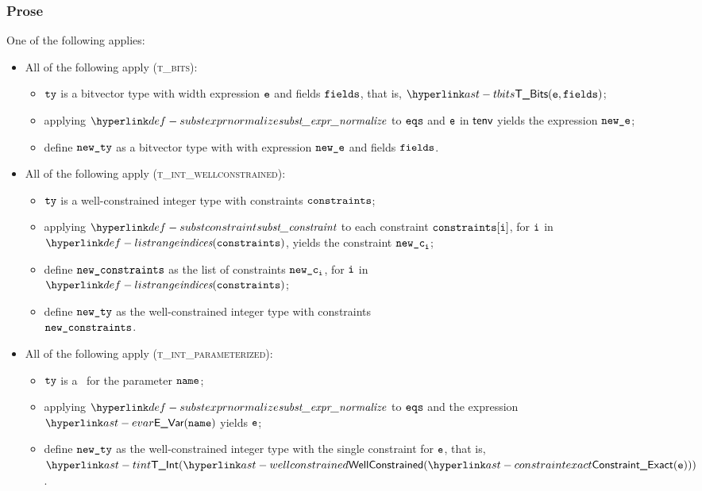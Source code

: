 \subsubsection{Prose}
One of the following applies:
\begin{itemize}
  \item All of the following apply (\textsc{t\_bits}):
  \begin{itemize}
    \item $\texttt{ty}$ is a bitvector type with width expression $\texttt{e}$ and fields $\texttt{fields}$, that is, $\TBits(\ve, \fields)$;
    \item applying $\substexprnormalize$ to $\texttt{eqs}$ and $\texttt{e}$ in $\textsf{tenv}$ yields the expression $\texttt{new\_e}$;
    \item define $\texttt{new\_ty}$ as a bitvector type with with expression $\texttt{new\_e}$ and fields $\texttt{fields}$.
  \end{itemize}

  \item All of the following apply (\textsc{t\_int\_wellconstrained}):
  \begin{itemize}
    \item $\texttt{ty}$ is a well-constrained integer type with constraints $\texttt{constraints}$;
    \item applying $\substconstraint$ to each constraint $\texttt{constraints}[\texttt{i}]$, for $\texttt{i}$ in \\
          $\listrange(\constraints)$, yields the constraint $\texttt{new\_c}_{\texttt{i}}$;
    \item define $\texttt{new\_constraints}$ as the list of constraints $\texttt{new\_c}_{\texttt{i}}$, for $\texttt{i}$ in \\
          $\listrange(\constraints)$;
    \item define $\texttt{new\_ty}$ as the well-constrained integer type with constraints \\
          $\texttt{new\_constraints}$.
  \end{itemize}

  \item All of the following apply (\textsc{t\_int\_parameterized}):
  \begin{itemize}
    \item $\texttt{ty}$ is a \parameterizedintegertype\ for the parameter $\texttt{name}$;
    \item applying $\substexprnormalize$ to $\texttt{eqs}$ and the expression $\EVar(\name)$ yields $\texttt{e}$;
    \item define $\texttt{new\_ty}$ as the well-constrained integer type with the single constraint for $\texttt{e}$, that is,
          $\TInt(\wellconstrained(\ConstraintExact(\ve)))$.
  \end{itemize}


\end{itemize}

